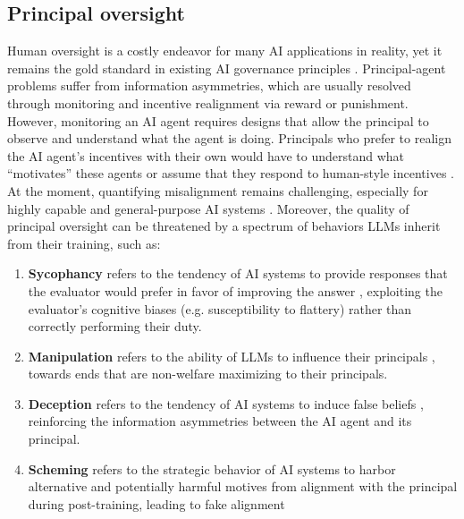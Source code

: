 \documentclass[11pt]{article}
\begin{document}
\subsection{Principal oversight}
\label{subsec:oversight}

Human oversight is a costly endeavor for many AI applications in reality, yet it remains the gold standard in existing AI governance principles \citep{sterz_quest_2024,cihon_chilling_2024}. Principal-agent problems suffer from information asymmetries, which are usually resolved through monitoring and incentive realignment via reward or punishment. However, monitoring an AI agent requires designs that allow the principal to observe and understand what the agent is doing. Principals who prefer to realign the AI agent's incentives \citep{everitt_agent_2021} with their own would have to understand what ``motivates'' these agents or assume that they respond to human-style incentives \citep{ratliff_perspective_2019}. At the moment, quantifying misalignment remains challenging, especially for highly capable and general-purpose AI systems \citep{anwar_foundational_2024}. Moreover, the quality of principal oversight can be threatened by a spectrum of behaviors LLMs inherit from their training, such as:
\begin{enumerate}[wide, labelindent=0pt, itemsep=-1pt, topsep=1pt]
    \item[\textbullet] \textbf{Sycophancy} refers to the tendency of AI systems to provide responses that the evaluator would prefer in favor of improving the answer \citep{perez_discovering_2023,sharma_towards_2024}, exploiting the evaluator's cognitive biases (e.g. susceptibility to flattery) rather than correctly performing their duty.
    \item[\textbullet] \textbf{Manipulation} refers to the ability of LLMs to influence their principals \citep{campedelli2024want, burtell2023artificial,carroll_characterizing_2023}, towards ends that are non-welfare maximizing to their principals.
    \item[\textbullet] \textbf{Deception} refers to the tendency of AI systems to induce false beliefs \citep{park_deception_2024,scheurer_large_2024,lang_when_2024}, reinforcing the information asymmetries between the AI agent and its principal.
     \item[\textbullet] \textbf{Scheming} refers to the strategic behavior of AI systems to harbor alternative and potentially harmful motives from alignment with the principal during post-training, leading to fake alignment \citep{greenblatt_alignment_2024,balesni_towards_2024}
\end{enumerate}
\end{document}
